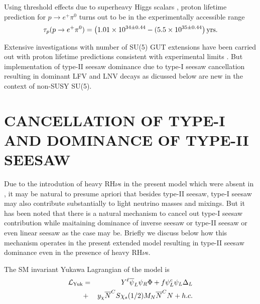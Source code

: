 \documentclass[a4paper,11pt]{article}
\newcommand{\be}{\begin{equation}}
\newcommand{\ee}{\end{equation}}
\newcommand{\bea}{\begin{eqnarray}}
\newcommand{\eea}{\end{eqnarray}}
\begin{document}
Using threshold effects due to superheavy Higgs scalars
\cite{Weinberg:1980,Hall:1981,Ovrut:1982,mkp:1987,mkp-cch:1989,rnm-mkp:1993,Langacker:1993,lmpr:1995},
 proton lifetime prediction for $p\to e^+\pi^0$ turns out to be in
the experimentally accessible range \cite{Abe:2017}
\be
\tau_p(p\to e^+\pi^0)= \left(1.01\times 10^{34\pm 0.44 }- (5.5\times
10^{35\pm 0.44 } \right) {\rm yrs}.\label{eq:taup}
\ee

Extensive investigations with number of SU(5) GUT extensions have been
carried out with
proton lifetime predictions
consistent with experimental limits
\cite{Dorsner,Nath-Perez:2007,Langacker:1981}. But implementation of type-II
seesaw dominance due to type-I seesaw cancellation resulting in
dominant LFV and LNV decays as dicussed below are new in the context
of non-SUSY SU(5). 



\section{CANCELLATION OF TYPE-I AND DOMINANCE OF TYPE-II SEESAW }\label{sec:cancel}

Due to the introdution of heavy RH$\nu$s in the present model which were absent
in \cite{scp:2018}, it may be natural to presume
apriori that besides type-II seesaw, type-I
seesaw may also contribute substantially to light neutrino masses and mixings. But
it has been noted  that there is a natural mechanism to cancel out
type-I seesaw contribution while maitaining dominance of inverse
seesaw \cite{mkp-bs:2015,Kim-Kang:2006,app:2013,Majee:2009,mkp-ARC:2010,pas:2014} or type-II seesaw or even linear seesaw
\cite{nurev:mkpbpn,bpn-mkp:2015} as the case may be. Briefly we
discuss below how this mechanism operates in the present extended
model resulting in
  type-II seesaw dominance even in the presence of heavy RH$\nu$s.




The SM invariant Yukawa Lagrangian of the   model is 
\bea
{\cal L}_{\rm Yuk} &=& Y^{\ell} {\overline{\psi}}_{L}\psi_{R} \Phi  
 +f \psi^c_{L} \psi_{L} \Delta_L \nonumber\\
&+& y_{\chi}{\overline N }^C S \chi_s 
(1/2)M_{N}{\overline N}^C N + h.c. \label{eq:Yuk-Lag} 
\eea 
\end{document}
